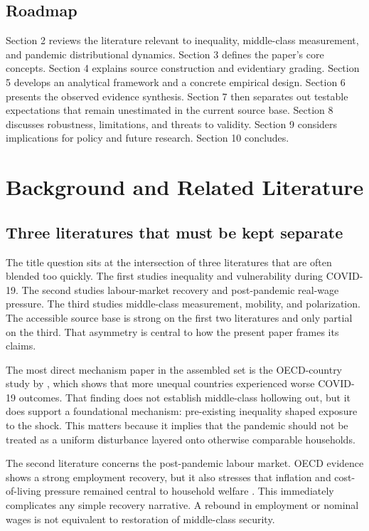 \documentclass[11pt]{article}
\begin{document}
\subsection{Roadmap}
Section 2 reviews the literature relevant to inequality, middle-class measurement, and pandemic distributional dynamics. Section 3 defines the paper's core concepts. Section 4 explains source construction and evidentiary grading. Section 5 develops an analytical framework and a concrete empirical design. Section 6 presents the observed evidence synthesis. Section 7 then separates out testable expectations that remain unestimated in the current source base. Section 8 discusses robustness, limitations, and threats to validity. Section 9 considers implications for policy and future research. Section 10 concludes.

\section{Background and Related Literature}

\subsection{Three literatures that must be kept separate}
The title question sits at the intersection of three literatures that are often blended too quickly. The first studies inequality and vulnerability during COVID-19. The second studies labour-market recovery and post-pandemic real-wage pressure. The third studies middle-class measurement, mobility, and polarization. The accessible source base is strong on the first two literatures and only partial on the third. That asymmetry is central to how the present paper frames its claims.

The most direct mechanism paper in the assembled set is the OECD-country study by \citet{covid19andincomein2021springer}, which shows that more unequal countries experienced worse COVID-19 outcomes. That finding does not establish middle-class hollowing out, but it does support a foundational mechanism: pre-existing inequality shaped exposure to the shock. This matters because it implies that the pandemic should not be treated as a uniform disturbance layered onto otherwise comparable households.

The second literature concerns the post-pandemic labour market. OECD evidence shows a strong employment recovery, but it also stresses that inflation and cost-of-living pressure remained central to household welfare \citep{oecdemploymentoutl2024oecd}. This immediately complicates any simple recovery narrative. A rebound in employment or nominal wages is not equivalent to restoration of middle-class security.
\end{document}
